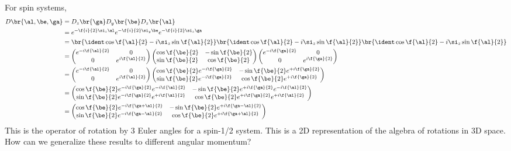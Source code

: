 \documentclass{article}
\begin{document}
For spin systems,
\begin{align*}
    D\br{\al, \be, \ga}
    &= D_z\br{\ga}D_y\br{\be}D_z\br{\al} \\
    &= e^{-\f{i}{2} \si_z \al}e^{-\f{i}{2} \si_y \be}e^{-\f{i}{2} \si_z \ga}  \\
    &= \br{\ident \cos \f{\al}{2} - i \si_z \sin \f{\al}{2}}\br{\ident \cos \f{\al}{2} - i \si_z \sin \f{\al}{2}}\br{\ident \cos \f{\al}{2} - i \si_z \sin \f{\al}{2}}\\
    &=
    \begin{pmatrix}
        e^{-i\f{\al}{2}} & 0 \\
        0 & e^{i\f{\al}{2}} \\
    \end{pmatrix}
    \begin{pmatrix}
        \cos \f{\be}{2} & -\sin \f{\be}{2} \\
        \sin \f{\be}{2} & \cos \f{\be}{2} \\
    \end{pmatrix}
    \begin{pmatrix}
        e^{-i\f{\ga}{2}} & 0 \\
        0 & e^{i\f{\ga}{2}} \\
    \end{pmatrix}
    \\
    &=
    \begin{pmatrix}
        e^{-i\f{\al}{2}} & 0 \\
        0 & e^{i\f{\al}{2}} \\
    \end{pmatrix}
    \begin{pmatrix}
        \cos \f{\be}{2}e^{-i\f{\ga}{2}} & -\sin \f{\be}{2}e^{+i\f{\ga}{2}} \\
        \sin \f{\be}{2}e^{-i\f{\ga}{2}} & \cos \f{\be}{2}e^{+i\f{\ga}{2}} \\
    \end{pmatrix}
    \\
    &=
    \begin{pmatrix}
        \cos \f{\be}{2}e^{-i\f{\ga}{2}}e^{-i\f{\al}{2}} & -\sin \f{\be}{2}e^{+i\f{\ga}{2}}e^{-i\f{\al}{2}} \\
        \sin \f{\be}{2}e^{-i\f{\ga}{2}}e^{+i\f{\al}{2}} & \cos \f{\be}{2}e^{+i\f{\ga}{2}}e^{+i\f{\al}{2}} \\
    \end{pmatrix}
    \\
    &= \begin{pmatrix}
        \cos \f{\be}{2}e^{-i\f{\ga+\al}{2}} & -\sin \f{\be}{2}e^{+i\f{\ga-\al}{2}} \\
        \sin \f{\be}{2}e^{-i\f{\ga - \al}{2}} & \cos \f{\be}{2}e^{+i\f{\ga+\al}{2}} \\
    \end{pmatrix}
    \\
\end{align*}
This is the operator of rotation by $3$ Euler angles for a spin-1/2 system. This is a 2D representation of the algebra of rotations in 3D space. How can we generalize these results to different angular momentum?
\end{document}

